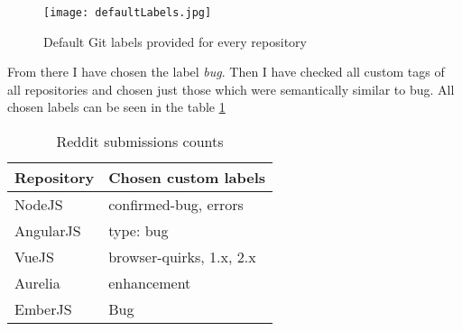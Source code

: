 \begin{figure}[H]%
    \centering
	\texttt{[image: defaultLabels.jpg]}
    \caption{Default Git labels provided for every repository}%
    \label{fig:defaultLabels}%
\end{figure}

From there I have chosen the label \textit{bug}. Then I have checked all custom tags of all repositories and chosen just those which were semantically similar to bug. All chosen labels can be seen in the table \ref{table:allGitBugLabels}


\begin{table}[H]
\centering
\begin{tabular}{ |p{3cm}||p{6cm}|}
 \hline
\textbf{ Repository }& \textbf{Chosen custom labels}\\
 \hline
 NodeJS   & confirmed-bug, errors \\ \hline
 AngularJS &   type: bug \\ \hline
 VueJS & browser-quirks, 1.x, 2.x\\ \hline
 Aurelia & enhancement\\ \hline
 EmberJS & Bug\\ \hline
\end{tabular}
\caption{Reddit submissions counts}
\label{table:allGitBugLabels}
\end{table}
